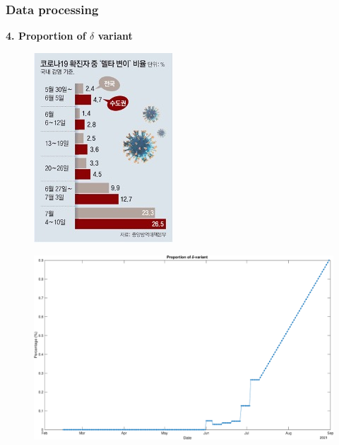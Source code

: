 \documentclass[aspectratio=169, 9pt, xcolor=dvipsnames]{beamer}
\begin{document}
	\begin{frame}\frametitle{Data processing}
	    \textbf{4. Proportion of $\delta$ variant} \\
	    \begin{minipage}{0.3\textwidth}
	    	\begin{figure}
		    	\centering
		    	\includegraphics[width=\textwidth]{delta.jpg}
		    \end{figure}
	    \end{minipage}
	    \hfill
	    \begin{minipage}{0.6\textwidth}
	    	\begin{figure}
	    		\centering
	    		\includegraphics[width=\textwidth]{../results/data/delta_proportion.eps}

\end{figure}
\end{minipage}
\end{frame}
\end{document}

